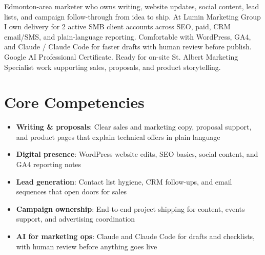\documentclass[11pt,a4paper,sans]{moderncv}
\begin{document}
\makecvtitle

\vspace{6pt}
\small{Edmonton-area marketer who owns writing, website updates, social content, lead lists, and campaign follow-through from idea to ship. At Lumin Marketing Group I own delivery for 2 active SMB client accounts across SEO, paid, CRM email/SMS, and plain-language reporting. Comfortable with WordPress, GA4, and Claude / Claude Code for faster drafts with human review before publish. Google AI Professional Certificate. Ready for on-site St. Albert Marketing Specialist work supporting sales, proposals, and product storytelling.}

\section{Core Competencies}
\vspace{1pt}
\begin{itemize}
\item \textbf{Writing \& proposals}: Clear sales and marketing copy, proposal support, and product pages that explain technical offers in plain language
\item \textbf{Digital presence}: WordPress website edits, SEO basics, social content, and GA4 reporting notes
\item \textbf{Lead generation}: Contact list hygiene, CRM follow-ups, and email sequences that open doors for sales
\item \textbf{Campaign ownership}: End-to-end project shipping for content, events support, and advertising coordination
\item \textbf{AI for marketing ops}: Claude and Claude Code for drafts and checklists, with human review before anything goes live
\end{itemize}
\end{document}
